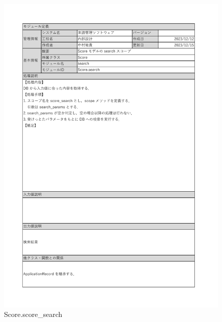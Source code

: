 \begin{figure}
    \centering
    \includegraphics[scale=0.5]{img/Model/Score_search(scope).pdf}
    \caption{Score.score\_search}
\end{figure}
\clearpage

